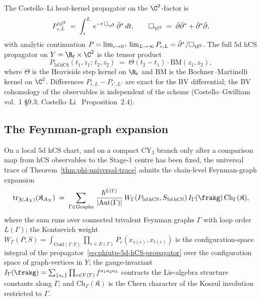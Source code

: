 \begin{proposition}
\label{prop:phiutp-5d-hcs-propagator}
The Costello--Li heat-kernel propagator on the $\C^2$-factor is
\[
 P_{\epsilon, L}^{\C^2}
 \;=\; \int_{\epsilon}^{L}\, e^{-t\,\Box_{\C^2}}\,\bar\partial^*\, dt,
\qquad
 \Box_{\C^2}
 \;=\; \bar\partial\bar\partial^* + \bar\partial^*\bar\partial,
\]
with analytic continuation
$P = \lim_{\epsilon\to 0^+}\lim_{L\to\infty}P_{\epsilon, L}
= \bar\partial^*/\Box_{\C^2}$. The full $5$d hCS propagator on
$Y = \R_t\times\C^2$ is the tensor product
\begin{equation}
\label{eq:phiutp-5d-hCS-propagator}
 P_{5\mathrm{d\,hCS}}(t_1, z_1;\, t_2, z_2)
 \;=\; \Theta(t_2 - t_1) \cdot
 \mathrm{BM}(z_1, z_2),
\end{equation}
where $\Theta$ is the Heaviside step kernel on $\R_t$ and
$\mathrm{BM}$ is the Bochner--Martinelli kernel on $\C^2$.
Differences $P_{\epsilon, L} - P_{\epsilon', L'}$ are exact for the
BV differential; the BV cohomology of the observables is independent
of the scheme \textup{(}Costello--Gwilliam~\cite{CostelloGwilliam}
vol.~1 \S$9.3$; Costello--Li~\cite{CostelloLi2016} Proposition~$2.4$\textup{).}
\end{proposition}

\subsection{The Feynman-graph expansion}
\label{subsec:phiutp-5d-hcs-feynman}

\begin{theorem}
\label{thm:phiutp-5d-hcs-feynman-universal-trace}
On a local \(5\)d hCS chart, and on a compact CY$_3$ branch only after
a comparison map from hCS observables to the Stage-$1$ centre has been
fixed, the universal trace of Theorem~\ref{thm:phi-universal-trace}
admits the chain-level Feynman-graph expansion
\begin{equation}
\label{eq:phiutp-feynman-expansion}
 \mathrm{tr}_{\mathfrak{Z}(\mathcal{A}_X)}(\mathfrak{K}_{\mathcal{A}_X})
 \;=\;
 \sum_{\Gamma\in \mathrm{Graphs}}\,
 \frac{\hbar^{L(\Gamma)}}{|\mathrm{Aut}(\Gamma)|}\,
 W_\Gamma(P_{5\mathrm{d\,hCS}}, S_{5\mathrm{d\,hCS}})\,
 I_\Gamma(\frakg)\,
 \mathrm{Ch}_\Gamma(\mathfrak{K}),
\end{equation}
where the sum runs over connected trivalent Feynman graphs $\Gamma$
with loop order $L(\Gamma)$; the Kontsevich weight
$W_\Gamma(P, S) = \int_{\mathrm{Conf}(\Gamma, Y)}\prod_{e\in E(\Gamma)}
P_e(x_{s(e)}, x_{t(e)})$ is the configuration-space integral of the
propagator~\eqref{eq:phiutp-5d-hCS-propagator} over the configuration
space of graph-vertices in $Y$; the gauge-invariant
$I_\Gamma(\frakg) = \sum_{\{a_e\}}\prod_{v\in V(\Gamma)} f^{a_1 a_2 a_3}$
contracts the Lie-algebra structure constants along $\Gamma$; and
$\mathrm{Ch}_\Gamma(\mathfrak{K})$ is the Chern character of the
Koszul involution restricted to $\Gamma$.
\end{theorem}

